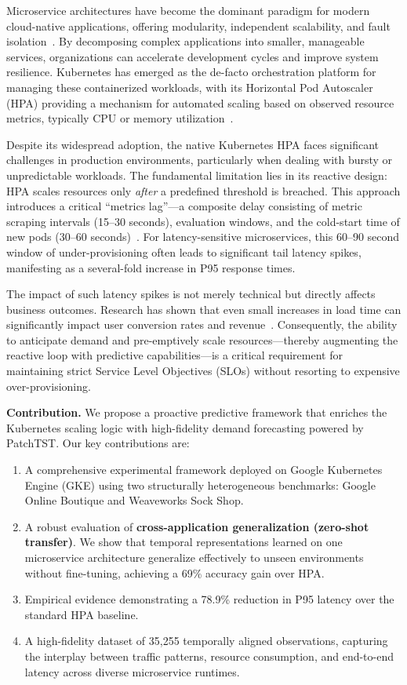 \documentclass[conference]{IEEEtran}
\begin{document}
Microservice architectures have become the dominant paradigm for modern cloud-native applications, offering modularity, independent scalability, and fault isolation~\cite{dragoni2017microservices}. By decomposing complex applications into smaller, manageable services, organizations can accelerate development cycles and improve system resilience. Kubernetes has emerged as the de-facto orchestration platform for managing these containerized workloads, with its Horizontal Pod Autoscaler (HPA) providing a mechanism for automated scaling based on observed resource metrics, typically CPU or memory utilization~\cite{burns2016borg}.

Despite its widespread adoption, the native Kubernetes HPA faces significant challenges in production environments, particularly when dealing with bursty or unpredictable workloads. The fundamental limitation lies in its reactive design: HPA scales resources only \textit{after} a predefined threshold is breached. This approach introduces a critical ``metrics lag''—a composite delay consisting of metric scraping intervals (15--30 seconds), evaluation windows, and the cold-start time of new pods (30--60 seconds)~\cite{nguyen2022survey}. For latency-sensitive microservices, this 60--90 second window of under-provisioning often leads to significant tail latency spikes, manifesting as a several-fold increase in P95 response times.

The impact of such latency spikes is not merely technical but directly affects business outcomes. Research has shown that even small increases in load time can significantly impact user conversion rates and revenue~\cite{amazon_latency}. Consequently, the ability to anticipate demand and pre-emptively scale resources—thereby augmenting the reactive loop with predictive capabilities—is a critical requirement for maintaining strict Service Level Objectives (SLOs) without resorting to expensive over-provisioning.

\textbf{Contribution.} We propose a proactive predictive framework that enriches the Kubernetes scaling logic with high-fidelity demand forecasting powered by PatchTST. Our key contributions are:

\begin{enumerate}
    \item A comprehensive experimental framework deployed on Google Kubernetes Engine (GKE) using two structurally heterogeneous benchmarks: Google Online Boutique and Weaveworks Sock Shop.
    \item A robust evaluation of \textbf{cross-application generalization (zero-shot transfer)}. We show that temporal representations learned on one microservice architecture generalize effectively to unseen environments without fine-tuning, achieving a 69\% accuracy gain over HPA.
    \item Empirical evidence demonstrating a 78.9\% reduction in P95 latency over the standard HPA baseline.
    \item A high-fidelity dataset of 35,255 temporally aligned observations, capturing the interplay between traffic patterns, resource consumption, and end-to-end latency across diverse microservice runtimes.
\end{enumerate}
\end{document}
